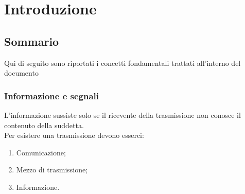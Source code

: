 \chapter{Introduzione}
\label{chap:intro}
\section{Sommario}
Qui di seguito sono riportati i concetti fondamentali trattati all'interno del documento
\subsection{Informazione e segnali}
\label{sec:Informazioneesegnali}
L'informazione sussiste solo se il ricevente della trasmissione non conosce il
contenuto della suddetta.\\ Per esistere una trasmissione devono esserci:
\begin{enumerate}
  \item Comunicazione;
  \item Mezzo di trasmissione;
  \item Informazione.
\end{enumerate}

